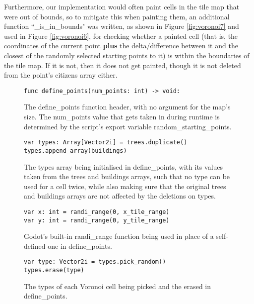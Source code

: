 Furthermore, our implementation would often paint cells in the tile map that were out of bounds, so to mitigate this when painting them, an additional function ``\_is\_in\_bounds" was written, as shown in Figure \ref{fig:voronoi7} and used in Figure \ref{fig:voronoi6}, for checking whether a painted cell (that is, the coordinates of the current point \textbf{plus} the delta/difference between it and the closest of the randomly selected starting points to it) is within the boundaries of the tile map. If it is not, then it does not get painted, though it is not deleted from the point's citizens array either.

\begin{figure}[H]
    \centering
    \begin{lstlisting}
func define_points(num_points: int) -> void:
    \end{lstlisting}
    \caption{The define\_points function header, with no argument for the map's size. The num\_points value that gets taken in during runtime is determined by the script's export variable random\_starting\_points.}
    \label{fig:voronoi1}
\end{figure}

\begin{figure}[H]
    \centering
    \begin{lstlisting}
var types: Array[Vector2i] = trees.duplicate()
types.append_array(buildings)
    \end{lstlisting}
    \caption{The types array being initialised in define\_points, with its values taken from the trees and buildings arrays, such that no type can be used for a cell twice, while also making sure that the original trees and buildings arrays are not affected by the deletions on types.}
    \label{fig:voronoi2}
\end{figure}

\begin{figure}[H]
    \centering
    \begin{lstlisting}
var x: int = randi_range(0, x_tile_range)
var y: int = randi_range(0, y_tile_range)
    \end{lstlisting}
    \caption{Godot's built-in randi\_range function being used in place of a self-defined one in define\_points.}
    \label{fig:voronoi3}
\end{figure}

\begin{figure}[H]
    \centering
    \begin{lstlisting}
var type: Vector2i = types.pick_random()
types.erase(type)
    \end{lstlisting}
    \caption{The types of each Voronoi cell being picked and the erased in define\_points.}
    \label{fig:voronoi4}
\end{figure}

